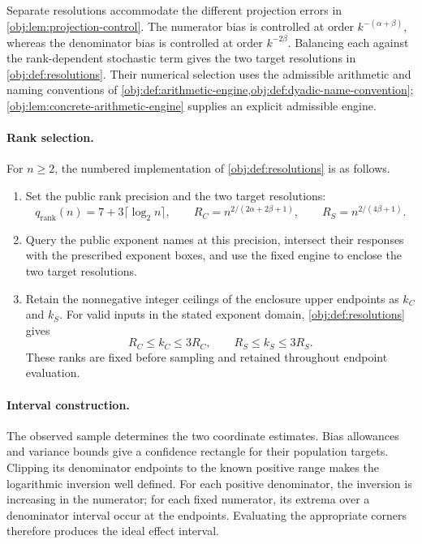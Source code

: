 Separate resolutions accommodate the different projection errors in \cref{obj:lem:projection-control}. The numerator bias is controlled at order \(k^{-(\alpha+\beta)}\), whereas the denominator bias is controlled at order \(k^{-2\beta}\). Balancing each against the rank-dependent stochastic term gives the two target resolutions in \cref{obj:def:resolutions}. Their numerical selection uses the admissible arithmetic and naming conventions of \cref{obj:def:arithmetic-engine,obj:def:dyadic-name-convention}; \cref{obj:lem:concrete-arithmetic-engine} supplies an explicit admissible engine.

\paragraph{Rank selection.}
For \(n\ge2\), the numbered implementation of \cref{obj:def:resolutions} is as follows.
\begin{enumerate}
\item Set the public rank precision  and the two target resolutions:
\[
q_{\mathrm{rank}}(n)=7+3\lceil\log_2 n\rceil,
\qquad
R_C=n^{2/(2\alpha+2\beta+1)},
\qquad
R_S=n^{2/(4\beta+1)}.
\]
\item Query the public exponent names at this precision, intersect their responses with the prescribed exponent boxes, and use the fixed engine to enclose the two target resolutions.
\item Retain the nonnegative integer ceilings of the enclosure upper endpoints as \(k_C\) and \(k_S\). For valid inputs in the stated exponent domain, \cref{obj:def:resolutions} gives
\[
R_C\le k_C\le3R_C,
\qquad
R_S\le k_S\le3R_S.
\]
These ranks are fixed before sampling and retained throughout endpoint evaluation.
\end{enumerate}
\paragraph{Interval construction.}
The observed sample  determines the two coordinate estimates. Bias allowances and variance bounds give a confidence rectangle for their population targets. Clipping its denominator endpoints to the known positive range makes the logarithmic inversion well defined. For each positive denominator, the inversion is increasing in the numerator; for each fixed numerator, its extrema over a denominator interval occur at the endpoints. Evaluating the appropriate corners therefore produces the ideal effect interval.

